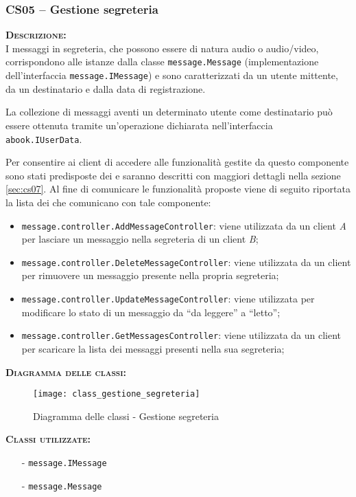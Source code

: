 
\subsubsection{CS05 -- Gestione segreteria}\label{sec:cs05}
\begin{description}
	\item{\scshape\bfseries Descrizione:}\\
I messaggi in segreteria, che possono essere di natura audio o audio/video, corrispondono alle istanze dalla classe \texttt{message.Message} (implementazione dell'interfaccia \texttt{message.IMessage}) e sono caratterizzati da un utente mittente, da un destinatario e dalla data di registrazione.

La collezione di messaggi aventi un determinato utente come destinatario può essere ottenuta tramite un'operazione dichiarata nell'interfaccia \texttt{abook.IUserData}.

Per consentire ai client di accedere alle funzionalità gestite da questo componente sono stati predisposte dei  e saranno descritti con maggiori dettagli nella sezione \vref{sec:cs07}. Al fine di comunicare le funzionalità proposte viene di seguito riportata la lista dei  che comunicano con tale componente:

\begin{itemize}
	\item \texttt{message.controller.AddMessageController}: viene utilizzata da un client \textit{A} per lasciare un messaggio nella segreteria di un client \textit{B};
	\item \texttt{message.controller.DeleteMessageController}: viene utilizzata da un client per rimuovere un messaggio presente nella propria segreteria;
	\item \texttt{message.controller.UpdateMessageController}: viene utilizzata per modificare lo stato di un messaggio da ``da leggere'' a ``letto'';
	\item \texttt{message.controller.GetMessagesController}: viene utilizzata da un client per scaricare la lista dei messaggi presenti nella sua segreteria;
\end{itemize}

	\item{\scshape\bfseries Diagramma delle classi:}
\begin{figure}[H]
  \centering
  \texttt{[image: class\_gestione\_segreteria]}
  \caption{Diagramma delle classi - Gestione segreteria}\label{fig:gestionesegreteria}
\end{figure}	
	
	\item{\scshape\bfseries Classi utilizzate:}
	\begin{itemize}[noitemsep,nolistsep]
		\item[-] \texttt{message.IMessage}
	  	\item[-] \texttt{message.Message}
	\end{itemize}
\end{description}

